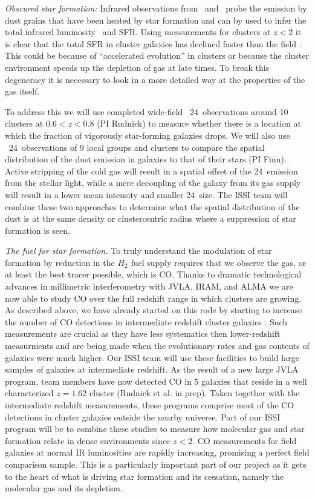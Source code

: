 \documentclass[11pt]{article}
\begin{document}
\textit{Obscured star formation:} Infrared observations from
\spitzer\ and \herschel\ probe the emission by dust grains that have
been heated by star formation and can by used to infer the total
infrared luminosity \lir\ and SFR.  Using measurements for clusters at
$z<2$ it is clear that the total SFR in cluster galaxies has declined
faster than the field \citep{Finn10,Saintonge08,Tran10,Alberts14}.
This could be because of ``accelerated evolution'' in clusters
\citep{Papovich12} or because the cluster environment speeds up the
depletion of gas at late times.  To break this degeneracy it is
necessary to look in a more detailed way at the properties of the gas
itself.

To address this we will use completed wide-field
\spitzer\ 24\micron\ observations around 10 clusters at $0.6<z<0.8$
(PI Rudnick) to measure whether there is a location at which the
fraction of vigorously star-forming galaxies drops.  We will also use
\spitzer\ 24\micron\ observations of 9 local groups and clusters to
compare the spatial distribution of the dust emission in galaxies to
that of their stars (PI Finn).  Active stripping of the cold gas will
result in a spatial offset of the 24\micron\ emission from the stellar
light, while a mere decoupling of the galaxy from its gas supply will
result in a lower mean intensity and smaller 24\micron\ size.  The
ISSI team will combine these two approaches to determine what the
spatial distribution of the dust is at the same density or
clustercentric radius where a suppression of star formation is seen.

\textit{The fuel for star formation.} To truly understand the
modulation of star formation by reduction in the $H_2$ fuel supply
requires that we observe the gas, or at least the best tracer
possible, which is CO.  Thanks to dramatic technological advances in
millimetric interferometry with JVLA, IRAM, and ALMA we are now able
to study CO over the full redshift range in which clusters are
growing.  As described above, we have already started on this rode by
starting to increase the number of CO detections in intermediate
redshift cluster galaxies \citep{Jablonka13}.  Such measurements are
crucial as they have less systematics then lower-redshift measurments
and are being made when the evolutionary rates and gas contents of
galaxies were much higher.  Our ISSI team will use these facilities to
build large samples of galaxies at intermediate redshift.  As the
result of a new large JVLA program, team members have now detected CO
in 5 galaxies that reside in a well characterized $z=1.62$ cluster
(Rudnick et al. in prep).  Taken together with the intermediate
redshift measurements, these programs comprise most of the CO
detections in cluster galaxies outside the nearby universe.  Part of
our ISSI program will be to combine these studies to measure how
molecular gas and star formation relate in dense environments since
$z<2$.  CO measurements for field galaxies at normal IR luminosities
are rapidly increasing, promising a perfect field comparison sample.
This is a particularly important part of our project as it gets to the
heart of what is driving star formation and its cessation, namely the
molecular gas and its depletion.
\end{document}
